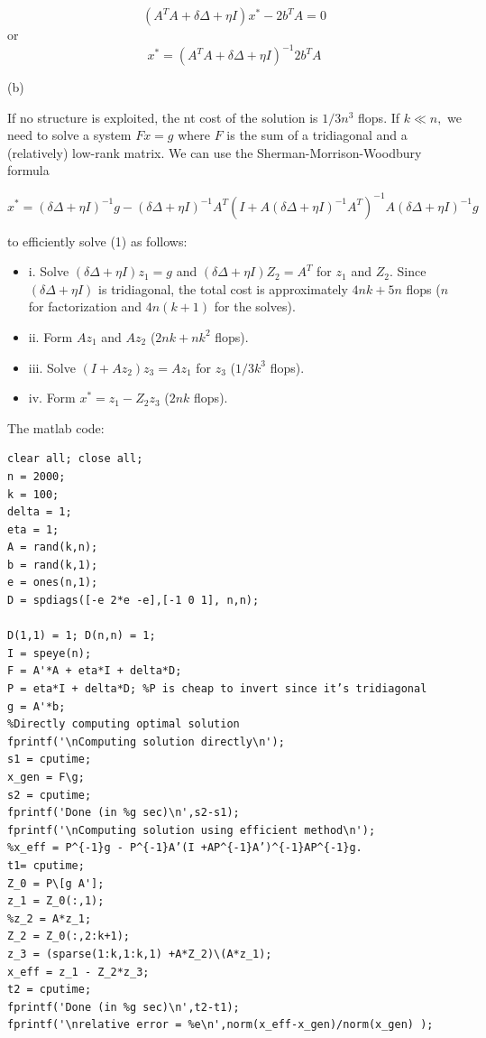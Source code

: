 \documentclass{article}
\begin{document}
$$
(A^TA + \delta \Delta + \eta I)x^* - 2b^T A = 0
$$
or
$$
x^* = (A^TA + \delta \Delta + \eta I)^{-1} 2b^T A 
$$

(b)

If no structure is exploited, the nt cost of the solution is $1/3 n^3$ flops. If $k \ll n,$ we need to solve a system $Fx = g$ where $F$ is the sum of a tridiagonal
and a (relatively) low-rank matrix. We can use the Sherman-Morrison-Woodbury formula

$$
x^* = (\delta \Delta + \eta I)^{-1} g - 
(\delta \Delta + \eta I)^{-1} A^T 
(I + A(\delta \Delta + \eta I )^{-1} A^T)^{-1} A 
 (\delta \Delta + \eta I)^{-1} g
$$

to efficiently solve (1) as follows:

\begin{itemize}
	\item i. Solve $(\delta \Delta + \eta I) z_1 = g$ and 
	$(\delta \Delta + \eta I) Z_2 = A^T$ for $z_1$ and $Z_2.$ Since $(\delta \Delta + \eta I)$ is tridiagonal, the total cost is approximately 
	$4 nk + 5n$ flops ($n$ for factorization and $4n(k + 1)$ for the solves).	
	\item ii. Form $Az_1$ and $Az_2$ ($2 nk + nk^2$ flops).
	\item iii. Solve $(I + Az_2) z_3 = Az_1$ for $z_3$ 
	($1/3 k^3$ flops).
	\item iv. Form $x^* = z_1 - Z_2 z_3$ ($2nk$ flops).
	
\end{itemize}

The matlab code:
\begin{verbatim}
clear all; close all;
n = 2000;
k = 100;
delta = 1;
eta = 1;
A = rand(k,n);
b = rand(k,1);
e = ones(n,1);
D = spdiags([-e 2*e -e],[-1 0 1], n,n);

D(1,1) = 1; D(n,n) = 1;
I = speye(n);
F = A'*A + eta*I + delta*D;
P = eta*I + delta*D; %P is cheap to invert since it’s tridiagonal
g = A'*b;
%Directly computing optimal solution
fprintf('\nComputing solution directly\n');
s1 = cputime;
x_gen = F\g;
s2 = cputime;
fprintf('Done (in %g sec)\n',s2-s1);
fprintf('\nComputing solution using efficient method\n');
%x_eff = P^{-1}g - P^{-1}A’(I +AP^{-1}A’)^{-1}AP^{-1}g.
t1= cputime;
Z_0 = P\[g A'];
z_1 = Z_0(:,1);
%z_2 = A*z_1;
Z_2 = Z_0(:,2:k+1);
z_3 = (sparse(1:k,1:k,1) +A*Z_2)\(A*z_1);
x_eff = z_1 - Z_2*z_3;
t2 = cputime;
fprintf('Done (in %g sec)\n',t2-t1);
fprintf('\nrelative error = %e\n',norm(x_eff-x_gen)/norm(x_gen) );
	
\end{verbatim}
\end{document}
